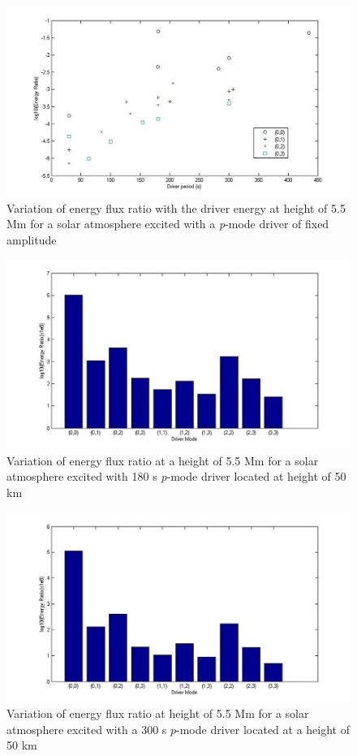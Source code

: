 \documentclass[preprint,authoryear,12pt]{elsarticle}
\begin{document}
\begin{figure}[t]
\includegraphics[scale=2]{imrescale/ratio_varoverdrve_eflux_vperiod_for_modes_5p5Mm.jpg}
\caption{Variation of energy flux ratio with the driver energy at height of 5.5 Mm for a solar atmosphere excited with a {\it p}-mode driver of fixed amplitude}
\label{Fig17}
\end{figure}


\begin{figure}[t]
\includegraphics[scale=2]{imrescale/ratio_varoverdrve_eflux_vperiod_forallmodes_180s_5p5Mm.jpg}
\caption{Variation of energy flux ratio at a height of 5.5 Mm for a solar atmosphere excited with 180 s {\it p}-mode driver located 
at height of 50 km}
\label{Fig18}
\end{figure}

\begin{figure}[t]
\includegraphics[scale=2]{imrescale/ratio_varoverdrve_eflux_vperiod_forallmodes_300s_5p5Mm.jpg}
\caption{Variation of energy flux ratio at height of 5.5 Mm for a solar atmosphere excited with a 300 s $p$-mode driver 
located at a height of 50 km}
\label{Fig19}
\end{figure}
\end{document}
